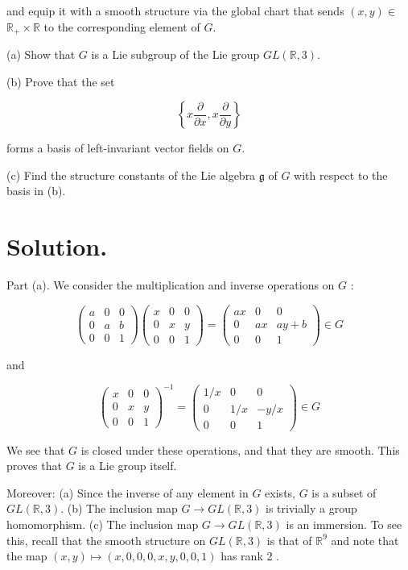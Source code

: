 \documentclass[10pt]{article}
\begin{document}
and equip it with a smooth structure via the global chart that sends $(x, y) \in$ $\mathbb{R}_{+} \times \mathbb{R}$ to the corresponding element of $G$.

(a) Show that $G$ is a Lie subgroup of the Lie group $G L(\mathbb{R}, 3)$.

(b) Prove that the set

$$
\left\{x \frac{\partial}{\partial x}, x \frac{\partial}{\partial y}\right\}
$$

forms a basis of left-invariant vector fields on $G$.

(c) Find the structure constants of the Lie algebra $\mathfrak{g}$ of $G$ with respect to the basis in (b).

\section{Solution.}
Part (a). We consider the multiplication and inverse operations on $G$ :

$$
\left(\begin{array}{ccc}
a & 0 & 0 \\
0 & a & b \\
0 & 0 & 1
\end{array}\right)\left(\begin{array}{ccc}
x & 0 & 0 \\
0 & x & y \\
0 & 0 & 1
\end{array}\right)=\left(\begin{array}{ccc}
a x & 0 & 0 \\
0 & a x & a y+b \\
0 & 0 & 1
\end{array}\right) \in G
$$

and

$$
\left(\begin{array}{lll}
x & 0 & 0 \\
0 & x & y \\
0 & 0 & 1
\end{array}\right)^{-1}=\left(\begin{array}{ccc}
1 / x & 0 & 0 \\
0 & 1 / x & -y / x \\
0 & 0 & 1
\end{array}\right) \in G
$$

We see that $G$ is closed under these operations, and that they are smooth. This proves that $G$ is a Lie group itself.

Moreover: (a) Since the inverse of any element in $G$ exists, $G$ is a subset of $G L(\mathbb{R}, 3)$. (b) The inclusion map $G \rightarrow G L(\mathbb{R}, 3)$ is trivially a group homomorphism. (c) The inclusion map $G \rightarrow G L(\mathbb{R}, 3)$ is an immersion. To see this,
recall that the smooth structure on $G L(\mathbb{R}, 3)$ is that of $\mathbb{R}^{9}$ and note that the map $(x, y) \mapsto(x, 0,0,0, x, y, 0,0,1)$ has rank 2 .
\end{document}
